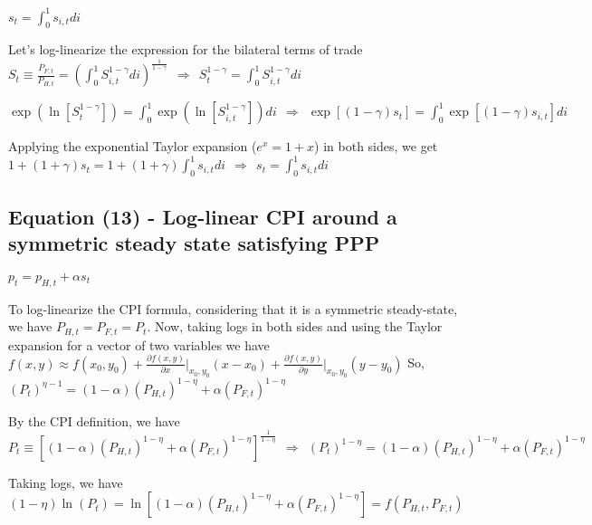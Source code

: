 \documentclass[
]{article}
\begin{document}
\(\displaystyle s_t = \int_0^1 s_{i,t}di\)

\vspace{8pt}

Let's log-linearize the expression for the bilateral terms of trade
\(\displaystyle S_t \equiv \frac{P_{F,t}}{P_{H,t}}= \left( \int_0^1 S_{i,t}^{1-\gamma}di \right)^{\frac{1}{1-\gamma}} \ \ \Rightarrow \ \ S_t^{1-\gamma} = \int_0^1 S_{i,t}^{1-\gamma}di\)

\(\displaystyle \exp \left(\ln \left[ S_t^{1-\gamma}\right] \right) = \int_0^1 \exp \left(\ln \left[ S_{i,t}^{1-\gamma}\right] \right)di \ \ \Rightarrow \ \ \exp[(1-\gamma)s_t]=\int_0^1 \exp[(1-\gamma)s_{i,t}]di\)

Applying the exponential Taylor expansion (\(e^x = 1 + x\)) in both
sides, we get
\(\displaystyle 1+(1+\gamma)s_t = 1 + (1+\gamma) \int_0^1 s_{i,t}di \ \ \Rightarrow \ \ s_t = \int_0^1 s_{i,t}di\)

\vspace{12pt}

\hypertarget{equation-13---log-linear-cpi-around-a-symmetric-steady-state-satisfying-ppp}{%
\subsection{Equation (13) - Log-linear CPI around a symmetric steady
state satisfying
PPP}\label{equation-13---log-linear-cpi-around-a-symmetric-steady-state-satisfying-ppp}}

\(p_t = p_{H,t} + \alpha s_t\)

\vspace{8pt}

To log-linearize the CPI formula, considering that it is a symmetric
steady-state, we have \(P_{H,t}=P_{F,t}=P_t\). Now, taking logs in both
sides and using the Taylor expansion for a vector of two variables we
have
\(\displaystyle f(x,y) \approx f(x_0,y_0)+\frac{\partial f(x,y)}{\partial x} \biggr|_{x_0,y_0}(x-x_0)+\frac{\partial f(x,y)}{\partial y} \biggr|_{x_0,y_0}(y-y_0)\)
So,
\(\displaystyle (P_t)^{\eta-1} = (1-\alpha)(P_{H,t})^{1-\eta} + \alpha(P_{F,t})^{1-\eta}\)

By the CPI definition, we have
\(\displaystyle P_t \equiv \left[ (1-\alpha)(P_{H,t})^{1-\eta} + \alpha(P_{F,t})^{1-\eta} \right]^{\frac{1}{1-\eta}} \ \ \Rightarrow \ \ (P_t)^{1-\eta} = (1-\alpha)(P_{H,t})^{1-\eta} + \alpha(P_{F,t})^{1-\eta}\)

Taking logs, we have
\((1-\eta)\ln(P_t) = \ln\left[ (1-\alpha)(P_{H,t})^{1-\eta} + \alpha(P_{F,t})^{1-\eta} \right]=f(P_{H,t},P_{F,t})\)
\end{document}

